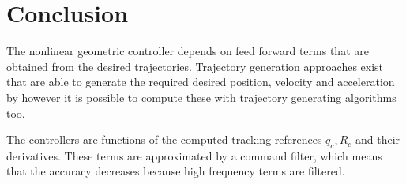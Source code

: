 \section{Conclusion}\label{set:set.con}




The nonlinear geometric controller depends on feed forward terms that are obtained from the desired trajectories. 
Trajectory generation approaches exist that are able to generate the required desired position, velocity and acceleration by 
however it is possible to compute these with trajectory generating algorithms too.

The controllers are functions of the computed tracking references $ q_c, R_c $ and their derivatives. These terms are approximated by a command filter, which means that the accuracy decreases because high frequency terms are filtered.

